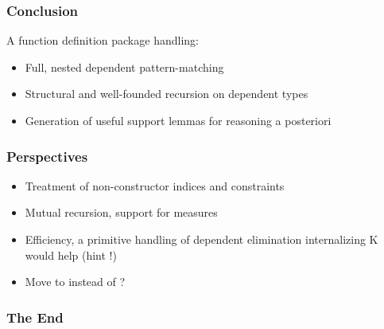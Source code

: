 \begin{frame}
  \frametitle{Conclusion}
  
  A function definition package handling:
  \begin{itemize}
  \item Full, nested dependent pattern-matching
  \item Structural and well-founded recursion on dependent types
  \item Generation of useful support lemmas for reasoning a posteriori
  \end{itemize}
  
\end{frame}

\begin{frame}
  \frametitle{Perspectives}
  
  \begin{itemize}
  \item Treatment of non-constructor indices and constraints
  \item Mutual recursion, support for measures
  \item Efficiency, a primitive handling of dependent elimination
    internalizing K would help (hint !)

  \item Move to  instead of ?
  \end{itemize}
  
\end{frame}

\begin{frame}
  \frametitle{The End}

  \begin{center}
  \end{center}
\end{frame}


